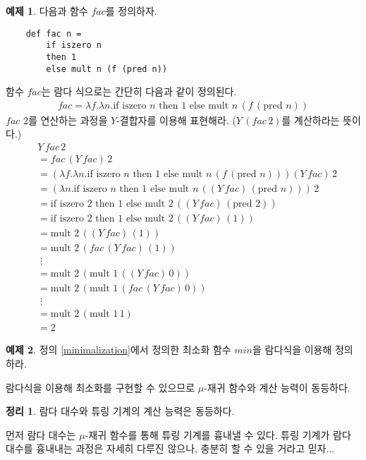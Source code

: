 \documentclass[b5paper]{book}
\theoremstyle{definition}
\newtheorem{thm}{정리}[chapter]
\newtheorem{ex}{예제}[chapter]
\newenvironment{pf*}{\pushQED{\qed}\pf}{\popQED\endpf}
\begin{document}
\begin{ex}
    다음과 함수 $fac$를 정의하자.
    \begin{lstlisting}
    def fac n =
        if iszero n 
        then 1 
        else mult n (f (pred n))
    \end{lstlisting}
    함수 $fac$는 람다 식으로는 간단히 다음과 같이 정의된다.
    \begin{align*}
        fac = \lambda f. \lambda n. \text{if } \text{iszero } n \text{ then }
        1 \text{ else } \text{mult } n \, (f \, (\text{pred } n))
    \end{align*}
    $fac$ 2를 연산하는 과정을 $Y$-결합자를 이용해 표현해라. ($Y \, (fac \, 2)$를 계산하라는 뜻이다.)
    \begin{align*}
        &Y \, fac \, 2 \\ 
        &= fac \, (Y \, fac) \, 2 \\ 
        &= (\lambda f. \lambda n. \text{if } \text{iszero } n \text{ then }
        1 \text{ else } \text{mult } n \, (f \, (\text{pred } n))) (Y \, fac) \, 2 \\
        &= (\lambda n. \text{if } \text{iszero } n \text{ then }
        1 \text{ else } \text{mult } n \, ((Y \, fac) \, (\text{pred } n))) \, 2 \\
        &=   \text{if } \text{iszero } 2 \text{ then }
        1 \text{ else } \text{mult } 2 \, ((Y \, fac) \, (\text{pred } 2))\\
        &=  \text{if } \text{iszero } 2 \text{ then }
        1 \text{ else } \text{mult } 2 \, ((Y \, fac) \, (1)) \\ 
        &= \text{mult } 2 \, ((Y \, fac) \, (1)) \\
        &= \text{mult } 2 \, (fac \, (Y \, fac) \, (1)) \\ 
        &\; \vdots \\ 
        &= \text{mult } 2 \, (\text{mult } 1 \, ((Y \, fac) \, 0)) \\
        &= \text{mult } 2 \, (\text{mult } 1 \, (fac \, (Y \, fac) \, 0)) \\ 
        &\; \vdots \\ 
        &= \text{mult } 2 \, (\text{mult } 1 \, 1) \\
        &= 2 
    \end{align*}
\end{ex}
\begin{ex}
    정의 \ref{minimalization}에서 정의한 최소화 함수 $min$을 람다식을 이용해 정의하라.
\end{ex}
람다식을 이용해 최소화를 구현할 수 있으므로 $\mu$-재귀 함수와 계산 능력이 동등하다. 
\begin{thm}
    람다 대수와 튜링 기계의 계산 능력은 동등하다.
\end{thm}
\begin{pf*}
    먼저 람다 대수는 $\mu$-재귀 함수를 통해 튜링 기계를 흉내낼 수 있다. 튜링 기계가 
    람다 대수를 흉내내는 과정은 자세히 다루진 않으나, 충분히 할 수 있을 거라고 믿자...
\end{pf*}
\end{document}
